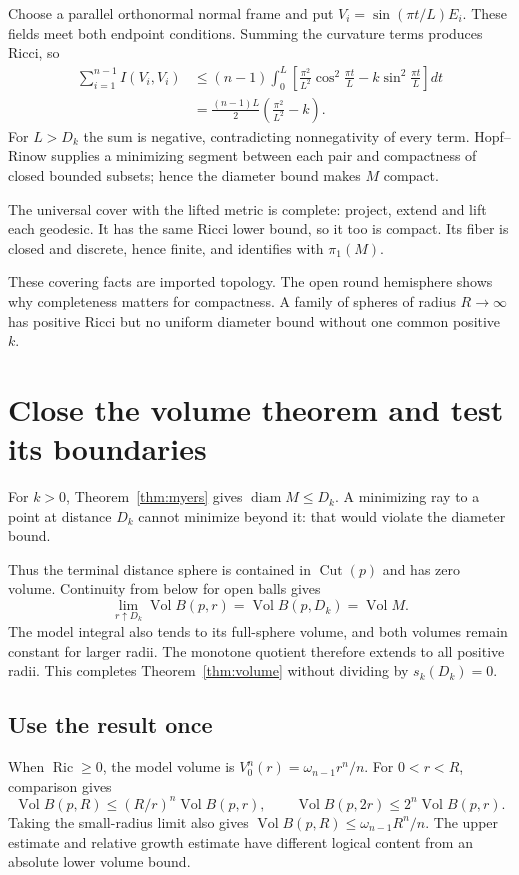 \documentclass[12pt,reqno]{amsart}
\begin{document}
Choose a parallel orthonormal normal frame and put \(V_i=\sin(\pi t/L)E_i\). These fields meet both endpoint conditions. Summing the curvature terms produces Ricci, so
\[
\begin{aligned}
\sum_{i=1}^{n-1}I(V_i,V_i)
&\le(n-1)\int_0^L\left[\frac{\pi^2}{L^2}\cos^2\frac{\pi t}{L}
-k\sin^2\frac{\pi t}{L}\right]dt\\
&=\frac{(n-1)L}{2}\left(\frac{\pi^2}{L^2}-k\right).
\end{aligned}
\]
For \(L>D_k\) the sum is negative, contradicting nonnegativity of every term. Hopf--Rinow supplies a minimizing segment between each pair and compactness of closed bounded subsets; hence the diameter bound makes \(M\) compact.

The universal cover with the lifted metric is complete: project, extend and lift each geodesic. It has the same Ricci lower bound, so it too is compact. Its fiber is closed and discrete, hence finite, and identifies with \(\pi_1(M)\).

These covering facts are imported topology. The open round hemisphere shows why completeness matters for compactness. A family of spheres of radius \(R\to\infty\) has positive Ricci but no uniform diameter bound without one common positive \(k\).


\section{Close the volume theorem and test its boundaries}
\label{sec:volume-endpoint}

For \(k>0\), Theorem~\ref{thm:myers} gives \(\operatorname{diam}M\le D_k\). A minimizing ray to a point at distance \(D_k\) cannot minimize beyond it: that would violate the diameter bound.

Thus the terminal distance sphere is contained in \(\operatorname{Cut}(p)\) and has zero volume. Continuity from below for open balls gives
\[
\lim_{r\uparrow D_k}\operatorname{Vol}B(p,r)
=\operatorname{Vol}B(p,D_k)=\operatorname{Vol}M.
\]
The model integral also tends to its full-sphere volume, and both volumes remain constant for larger radii. The monotone quotient therefore extends to all positive radii. This completes Theorem~\ref{thm:volume} without dividing by \(s_k(D_k)=0\).

\subsection{Use the result once}
When \(\operatorname{Ric}\ge0\), the model volume is \(V_0^n(r)=\omega_{n-1}r^n/n\). For \(0<r<R\), comparison gives
\[
\operatorname{Vol}B(p,R)\le (R/r)^n\operatorname{Vol}B(p,r),
\qquad \operatorname{Vol}B(p,2r)\le2^n\operatorname{Vol}B(p,r).
\]
Taking the small-radius limit also gives \(\operatorname{Vol}B(p,R)\le\omega_{n-1}R^n/n\). The upper estimate and relative growth estimate have different logical content from an absolute lower volume bound.
\end{document}
